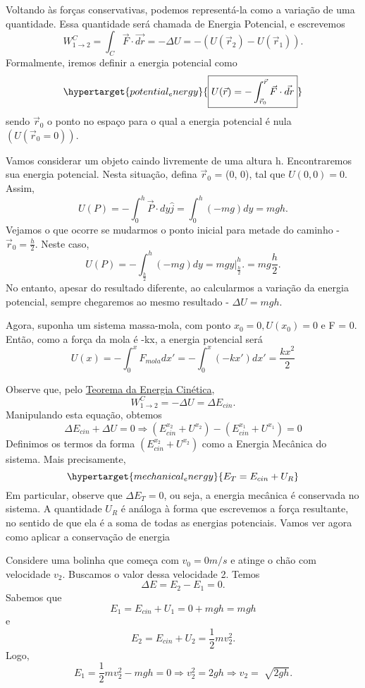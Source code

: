 \documentclass[PhysicsI/physics_notes.tex]{subfiles}
\begin{document}
Voltando às forças conservativas, podemos representá-la como a variação de uma quantidade.
Essa quantidade será chamada de Energia Potencial, e escrevemos
\[
	W_{1\rightarrow2}^{C} = \int_{C}^{}\vec{F}\cdot \vec{dr} = -\Delta U = -(U(\vec{r}_{2}) - U(\vec{r}_{1})).
\]
Formalmente, iremos definir a energia potencial como
\[
	\hypertarget{potential_energy}{\boxed{U(\vec{r}) = -\int_{\vec{r}_{0}}^{\vec{r}}\vec{F}\cdot \vec{dr}}}
\]
sendo \(\vec{r}_{0}\) o ponto no espaço para o qual a energia potencial é nula \((U(\vec{r}_{0} = 0))\).
\begin{example}
	Vamos considerar um objeto caindo livremente de uma altura h. Encontraremos sua energia potencial.
	Nesta situação, defina \(\vec{r}_{0}\) = (0, 0), tal que \(U(0, 0) = 0.\) Assim,
	\[
		U(P) = -\int_{0}^{h}\vec{P}\cdot dy\hat{j} = \int_{0}^{h}(-mg)dy = mgh.
	\]
	Vejamos o que ocorre se mudarmos o ponto inicial para metade do caminho - \(\vec{r}_{0} = \frac{h}{2}\). Neste caso,
	\[
		U(P) = -\int_{\frac{h}{2}}^{h}(-mg)dy = mgy \biggl|_{\frac{h}{2}}^{h}\biggr. = mg \frac{h}{2}.
	\]
	No entanto, apesar do resultado diferente, ao calcularmos a variação da energia potencial,
	sempre chegaremos ao mesmo resultado - \(\Delta U = mgh.\)
\end{example}
\begin{example}
	Agora, suponha um sistema massa-mola, com ponto \(x_{0} = 0, U(x_{0}) = 0\)
	e F = 0. Então, como a força da mola é -kx, a energia potencial será
	\[
		U(x) = -\int_{0}^{x}F_{mola}dx'= - \int_{0}^{x}(-kx')dx' = \frac{kx^{2}}{2}
	\]
\end{example}

Observe que, pelo \hyperlink{work_kin_3d}{Teorema da Energia Cinética},
\[
	W_{1\rightarrow2}^{C} = -\Delta U = \Delta E_{cin}.
\]
Manipulando esta equação, obtemos
\[
	\Delta E_{cin} + \Delta U = 0 \Rightarrow (E_{cin}^{x_2} + U^{x_2}) - (E_{cin}^{x_1} + U^{x_1}) = 0
\]
Definimos os termos da forma \((E_{cin}^{x_2} + U^{x_2})\) como a Energia Mecânica do sistema. Mais precisamente,
\[
	\hypertarget{mechanical_energy}{E_{T} = E_{cin} + U_{R}}
\]
Em particular, observe que \(\Delta E_{T} = 0\), ou seja, a energia
mecânica é conservada no sistema. A quantidade \(U_{R}\) é análoga à
forma que escrevemos a força resultante, no sentido de que ela é a soma
de todas as energias potenciais. Vamos ver agora como aplicar a conservação de energia
\begin{example}
	Considere uma bolinha que começa com \(v_{0} = 0m/s\) e atinge o chão com velocidade
	\(v_{2}\). Buscamos o valor dessa velocidade 2. Temos
	\[
		\Delta E = E_{2} - E_{1} = 0.
	\]
	Sabemos que
	\[
		E_{1} = E_{cin} + U_{1} = 0 + mgh = mgh
	\]
	e
	\[
		E_{2} = E_{cin} + U_{2} = \frac{1}{2}mv_{2}^{2}.
	\]
	Logo,
	\[
		E_{1} = \frac{1}{2}mv_{2}^{2} - mgh = 0 \Rightarrow v_{2}^{2} = 2gh \Rightarrow v_{2} = \sqrt[]{2gh}.
	\]
\end{example}
\end{document}
